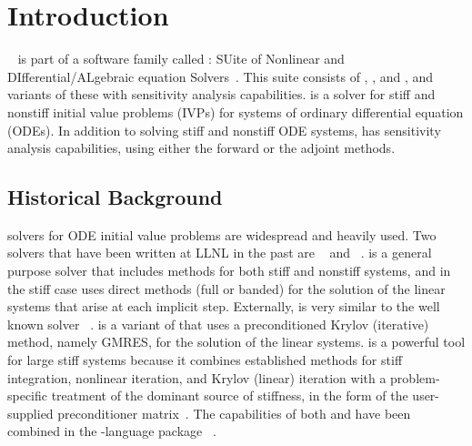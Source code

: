 \chapter{Introduction}\label{s:intro}

{\cvodes}~\cite{SeHi:05} is part of a software family called {\sundials}: 
SUite of Nonlinear and DIfferential/ALgebraic equation Solvers~\cite{HBGLSSW:05}.  
This suite consists of {\cvode}, {\arkode}, {\kinsol} and {\ida}, and variants
of these with sensitivity analysis capabilities.
%
{\cvodes} is a solver for
stiff and nonstiff initial value problems (IVPs) for systems of
ordinary differential equation (ODEs). In addition to solving stiff
and nonstiff ODE systems, {\cvodes} has sensitivity analysis
capabilities, using either the forward or the adjoint methods.

\section{Historical Background}\label{ss:history}

{\F} solvers for ODE initial value problems are widespread and heavily used. 
Two solvers that have been written at LLNL in the past are {\vode}~\cite{BBH:89} 
and {\vodpk}~\cite{Byr:92}.
{\vode} is a general purpose solver that includes methods for
both stiff and nonstiff systems, and in the stiff case uses direct methods (full or
banded) for the solution of the linear systems that arise at each implicit
step. Externally, {\vode} is very similar to the well known solver
{\lsode}~\cite{RaHi:94}. {\vodpk}
is a variant of {\vode} that uses a preconditioned Krylov (iterative)
method, namely GMRES, for the solution of the linear systems. {\vodpk}
is a powerful tool for large stiff systems because it combines
established methods for stiff integration, nonlinear iteration, and
Krylov (linear) iteration with a problem-specific treatment of the
dominant source of stiffness, in the form of the user-supplied
preconditioner matrix~\cite{BrHi:89}.  The capabilities of both
{\vode} and {\vodpk} have been combined in the {\CC}-language package
{\cvode}~\cite{CoHi:96}.

